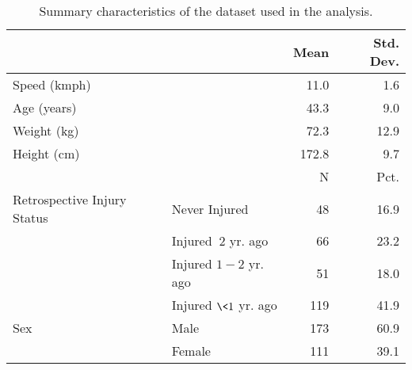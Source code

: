 \begin{table}

\caption{Summary characteristics of the dataset used in the analysis.}
\centering
\begin{tabular}[t]{llrr}
\toprule
  &    & Mean & Std. Dev.\\
\midrule
Speed (kmph) &  & 11.0 & 1.6\\
Age (years) &  & 43.3 & 9.0\\
Weight (kg) &  & 72.3 & 12.9\\
Height (cm) &  & 172.8 & 9.7\\
\midrule
 &  & N & Pct.\\
Retrospective Injury Status & Never Injured & 48 & 16.9\\
 & Injured $\>2$ yr. ago & 66 & 23.2\\
 & Injured $1-2$ yr. ago & 51 & 18.0\\
 & Injured $\<1$ yr. ago & 119 & 41.9\\
Sex & Male & 173 & 60.9\\
 & Female & 111 & 39.1\\
\bottomrule
\end{tabular}
\end{table}
